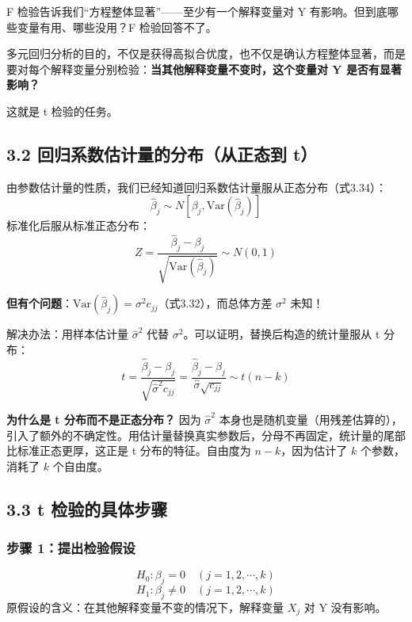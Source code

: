 \documentclass[12pt,a4paper]{ctexart}
\begin{document}
F 检验告诉我们“方程整体显著”——至少有一个解释变量对 Y 有影响。但到底哪些变量有用、哪些没用？F 检验回答不了。

多元回归分析的目的，不仅是获得高拟合优度，也不仅是确认方程整体显著，而是要对每个解释变量分别检验：\textbf{当其他解释变量不变时，这个变量对 Y 是否有显著影响？}

这就是 t 检验的任务。

\subsection{3.2 回归系数估计量的分布（从正态到 t）}

由参数估计量的性质，我们已经知道回归系数估计量服从正态分布（式3.34）：
\[
\hat{\beta}_j \sim N[\beta_j, \mathrm{Var}(\hat{\beta}_j)]
\]
标准化后服从标准正态分布：
\begin{equation}
Z = \frac{\hat{\beta}_j - \beta_j}{\sqrt{\mathrm{Var}(\hat{\beta}_j)}} \sim N(0,1) \tag{3.49}
\end{equation}

\textbf{但有个问题}：\(\mathrm{Var}(\hat{\beta}_j) = \sigma^2 c_{jj}\)（式3.32），而总体方差 \(\sigma^2\) 未知！

解决办法：用样本估计量 \(\hat{\sigma}^2\) 代替 \(\sigma^2\)。可以证明，替换后构造的统计量服从 t 分布：
\begin{equation}
t = \frac{\hat{\beta}_j - \beta_j}{\sqrt{\hat{\sigma}^2 c_{jj}}} = \frac{\hat{\beta}_j - \beta_j}{\hat{\sigma}\sqrt{c_{jj}}} \sim t(n-k) \tag{3.50}
\end{equation}

\textbf{为什么是 t 分布而不是正态分布？} 因为 \(\hat{\sigma}^2\) 本身也是随机变量（用残差估算的），引入了额外的不确定性。用估计量替换真实参数后，分母不再固定，统计量的尾部比标准正态更厚，这正是 t 分布的特征。自由度为 \(n-k\)，因为估计了 \(k\) 个参数，消耗了 \(k\) 个自由度。

\subsection{3.3 t 检验的具体步骤}

\subsubsection{步骤 1：提出检验假设}
\[
H_0: \beta_j = 0 \quad (j = 1, 2, \cdots, k)
\]
\[
H_1: \beta_j \neq 0 \quad (j = 1, 2, \cdots, k)
\]
原假设的含义：在其他解释变量不变的情况下，解释变量 \(X_j\) 对 Y 没有影响。
\end{document}
